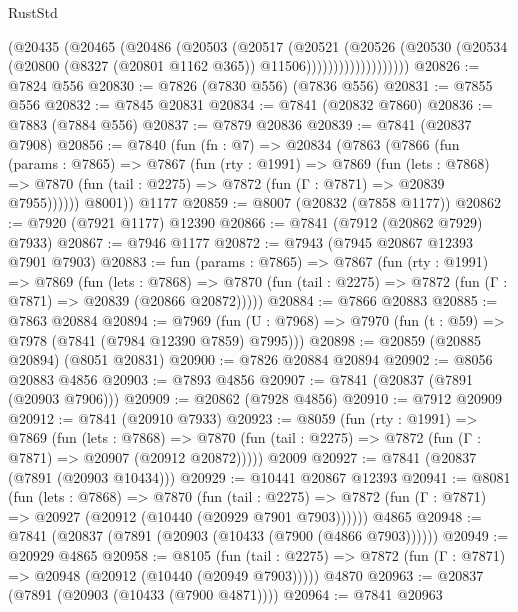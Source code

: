 \begin{lexlean}{RustStd}
\begin{coremodule}
                      (@20435
                        (@20465
                          (@20486
                            (@20503
                              (@20517
                                (@20521
                                  (@20526
                                    (@20530
                                      (@20534
                                        (@20800
                                          (@8327 (@20801 @1162 @365))
                                          @11506)))))))))))))))))))
@20826 := @7824 @556
@20830 := @7826 (@7830 @556) (@7836 @556)
@20831 := @7855 @556
@20832 := @7845 @20831
@20834 := @7841 (@20832 @7860)
@20836 := @7883 (@7884 @556)
@20837 := @7879 @20836
@20839 := @7841 (@20837 @7908)
@20856 := @7840
    (fun (fn : @7) =>
    @20834
      (@7863
        (@7866
          (fun (params : @7865) =>
          @7867
            (fun (rty : @1991) =>
            @7869
              (fun (lets : @7868) =>
              @7870 (fun (tail : @2275) => @7872 (fun (Γ : @7871) => @20839 @7955))))))
        @8001))
    @1177
@20859 := @8007 (@20832 (@7858 @1177))
@20862 := @7920 (@7921 @1177) @12390
@20866 := @7841 (@7912 (@20862 @7929) @7933)
@20867 := @7946 @1177
@20872 := @7943 (@7945 @20867 @12393 @7901 @7903)
@20883 := fun (params : @7865) =>
  @7867
    (fun (rty : @1991) =>
    @7869
      (fun (lets : @7868) =>
      @7870 (fun (tail : @2275) => @7872 (fun (Γ : @7871) => @20839 (@20866 @20872)))))
@20884 := @7866 @20883
@20885 := @7863 @20884
@20894 := @7969
    (fun (U : @7968) => @7970 (fun (t : @59) => @7978 (@7841 (@7984 @12390 @7859) @7995)))
@20898 := @20859 (@20885 @20894) (@8051 @20831)
@20900 := @7826 @20884 @20894
@20902 := @8056 @20883 @4856
@20903 := @7893 @4856
@20907 := @7841 (@20837 (@7891 (@20903 @7906)))
@20909 := @20862 (@7928 @4856)
@20910 := @7912 @20909
@20912 := @7841 (@20910 @7933)
@20923 := @8059
    (fun (rty : @1991) =>
    @7869
      (fun (lets : @7868) =>
      @7870 (fun (tail : @2275) => @7872 (fun (Γ : @7871) => @20907 (@20912 @20872)))))
    @2009
@20927 := @7841 (@20837 (@7891 (@20903 @10434)))
@20929 := @10441 @20867 @12393
@20941 := @8081
    (fun (lets : @7868) =>
    @7870
      (fun (tail : @2275) =>
      @7872 (fun (Γ : @7871) => @20927 (@20912 (@10440 (@20929 @7901 @7903))))))
    @4865
@20948 := @7841 (@20837 (@7891 (@20903 (@10433 (@7900 (@4866 @7903))))))
@20949 := @20929 @4865
@20958 := @8105
    (fun (tail : @2275) => @7872 (fun (Γ : @7871) => @20948 (@20912 (@10440 (@20949 @7903)))))
    @4870
@20963 := @20837 (@7891 (@20903 (@10433 (@7900 @4871))))
@20964 := @7841 @20963

\end{coremodule}
\end{lexlean}
